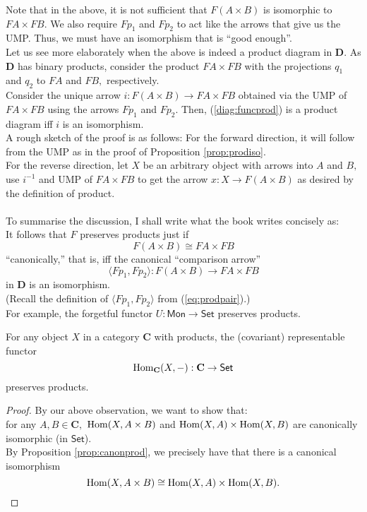 Note that in the above, it is not sufficient that $F(A \times B)$ is isomorphic to $FA \times FB.$ We also require $Fp_1$ and $Fp_2$ to act like the arrows that give us the UMP. Thus, we must have an isomorphism that is ``good enough''.\\
Let us see more elaborately when the above is indeed a product diagram in $\mathbf{D}.$ As $\mathbf{D}$ has binary products, consider the product $FA \times FB$ with the projections $q_1$ and $q_2$ to $FA$ and $FB,$ respectively.\\
Consider the unique arrow $i:F(A\times B) \to FA \times FB$ obtained via the UMP of $FA \times FB$ using the arrows $Fp_1$ and $Fp_2.$ Then, (\ref{diag:funcprod}) is a product diagram iff $i$ is an isomorphism.\\
A rough sketch of the proof is as follows: For the forward direction, it will follow from the UMP as in the proof of Proposition \ref{prop:prodiso}.\\
For the reverse direction, let $X$ be an arbitrary object with arrows into $A$ and $B,$ use $i^{-1}$ and UMP of $FA \times FB$ to get the arrow $x:X\to F(A \times B)$ as desired by the definition of product.\\~\\
To summarise the discussion, I shall write what the book writes concisely as:\\
It follows that $F$ preserves products just if
\begin{equation*} 
	F(A\times B) \cong FA \times FB
\end{equation*}
``canonically,'' that is, iff the canonical ``comparison arrow''
\begin{equation*} 
	\langle Fp_1, Fp_2\rangle : F(A \times B) \to FA \times FB
\end{equation*}
in $\mathbf{D}$ is an isomorphism.\\
(Recall the definition of $\langle Fp_1, Fp_2\rangle$ from (\ref{eq:prodpair}).)\\
For example, the forgetful functor $U:\mathsf{Mon}\to\mathsf{Set}$ preserves products.
\begin{cor}
	For any object $X$ in a category $\mathbf{C}$ with products, the (covariant) representable functor
	\begin{equation*} 
		\operatorname{Hom}_{\mathbf{C}}(X, -) : \mathbf{C} \to \mathsf{Set}
	\end{equation*}
	preserves products.
\end{cor}
\begin{proof} 
	By our above observation, we want to show that: \\
	for any $A, B \in \mathbf{C},$ $\operatorname{Hom}(X, A\times B)$ and $\operatorname{Hom}(X, A) \times \operatorname{Hom}(X, B)$ are canonically isomorphic (in $\mathsf{Set}$). \\
	By Proposition \ref{prop:canonprod}, we precisely have that there is a canonical isomorphism
	\begin{equation*} 
		\operatorname{Hom}(X, A \times B) \cong \operatorname{Hom}(X, A) \times \operatorname{Hom}(X, B).
	\end{equation*}
\end{proof}